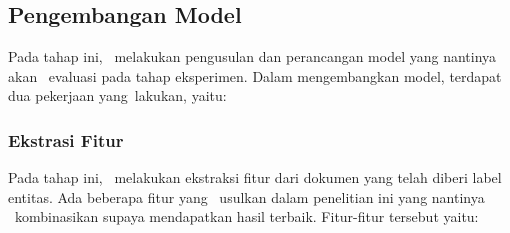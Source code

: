 	\subsection{Pengembangan Model}
	Pada tahap ini, \saya~melakukan pengusulan dan perancangan model yang nantinya akan \saya~evaluasi pada tahap eksperimen. Dalam mengembangkan model, terdapat dua pekerjaan yang\saya~lakukan, yaitu:
	
	\subsubsection{Ekstrasi Fitur}
	Pada tahap ini, \saya~melakukan ekstraksi fitur dari dokumen yang telah diberi label entitas. Ada beberapa fitur yang \saya~usulkan dalam penelitian ini yang nantinya \saya~kombinasikan supaya mendapatkan hasil terbaik. Fitur-fitur tersebut yaitu:
